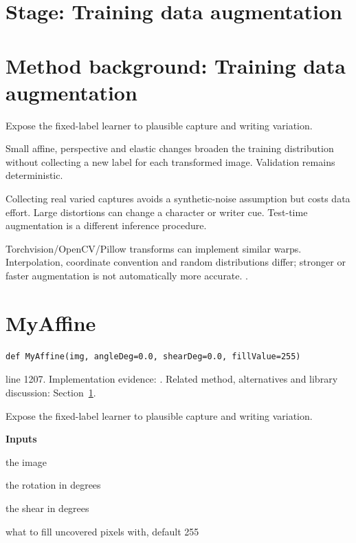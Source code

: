 \section*{Stage: Training data augmentation}
\section{Method background: Training data augmentation}\label{method:augment}
Expose the fixed-label learner to plausible capture and writing variation.


Small affine, perspective and elastic changes broaden the training distribution without collecting a new label for each transformed image. Validation remains deterministic.


Collecting real varied captures avoids a synthetic-noise assumption but costs data effort. Large distortions can change a character or writer cue. Test-time augmentation is a different inference procedure.


Torchvision/OpenCV/Pillow transforms can implement similar warps. Interpolation, coordinate convention and random distributions differ; stronger or faster augmentation is not automatically more accurate. \cite{simard2003,wolberg1990,opencvtransform}.


\section{MyAffine}\label{fn:train:MyAffine}
\begin{lstlisting}[style=sig]
def MyAffine(img, angleDeg=0.0, shearDeg=0.0, fillValue=255)
\end{lstlisting}
 line 1207. Implementation evidence: \cite{code2026}. Related method, alternatives and library discussion: Section~\ref{method:augment}.


Expose the fixed-label learner to plausible capture and writing variation.




\noindent\textbf{Inputs}
\begin{description}[leftmargin=2.2em,style=nextline,font=\normalfont\ttfamily]\setlength\itemsep{1pt}
  \item[{img}] \normalfont the image
  \item[{angleDeg}] \normalfont the rotation in degrees
  \item[{shearDeg}] \normalfont the shear in degrees
  \item[{fillValue}] \normalfont what to fill uncovered pixels with, default 255
\end{description}

